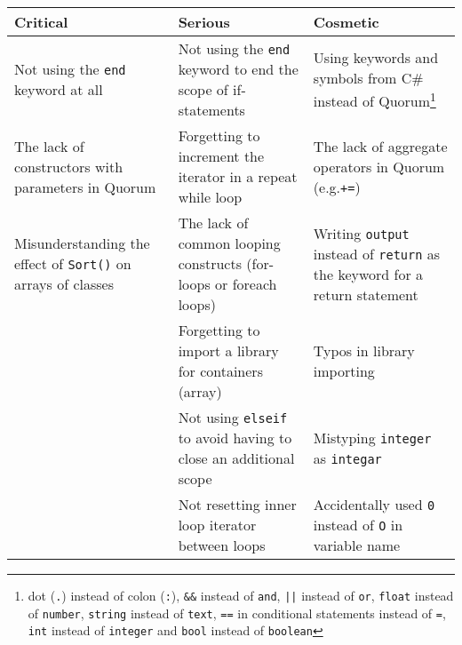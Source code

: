 \documentclass[10pt]{sigplanconf}
\begin{document}
\begin{table*}[]
\renewcommand{\arraystretch}{1.5}
\begin{minipage}[c]{\textwidth}
\begin{center}
\begin{tabular}{| p{5cm} | p{5cm} | p{5cm} |}
\hline
\textbf{Critical}                                          & \textbf{Serious}                                                   & \textbf{Cosmetic}                                                                                        \\ \hline
Not using the \lstinline!end! keyword at all               & Not using the \lstinline!end! keyword to end the scope of if-statements      & Using keywords and symbols from C\# instead of Quorum\footnote{dot (\lstinline!.!) instead of colon (\lstinline!:!), \lstinline!&&! instead of \lstinline!and!, \lstinline!||! instead of \lstinline!or!, \lstinline!float! instead of \lstinline!number!, \lstinline!string! instead of \lstinline!text!, \lstinline!==! in conditional statements instead of \lstinline!=!, \lstinline!int! instead of \lstinline!integer! and \lstinline!bool! instead of \lstinline!boolean!} \\ \hline
The lack of constructors with parameters in Quorum         & Forgetting to increment the iterator in a repeat while loop        & The lack of aggregate operators in Quorum (e.g.\lstinline!+=!)                                           \\ \hline
Misunderstanding the effect of \lstinline!Sort()! on arrays of classes & The lack of common looping constructs (for-loops or foreach loops) &  Writing \lstinline!output! instead of \lstinline!return! as the keyword for a return statement \\ \hline
                                                           & Forgetting to import a library for containers (array)              & Typos in library importing                                                					           \\ \hline
                                                           & Not using \lstinline!elseif! to avoid having to close an additional scope    & Mistyping \lstinline!integer! as \lstinline!integar!                                 \\ \hline
                                                           & Not resetting inner loop iterator between loops                    & Accidentally used \lstinline!0! instead of \lstinline!O! in variable name						           \\ \hline

\end{tabular}
\end{center}
\end{minipage}
\end{table*}
\end{document}

